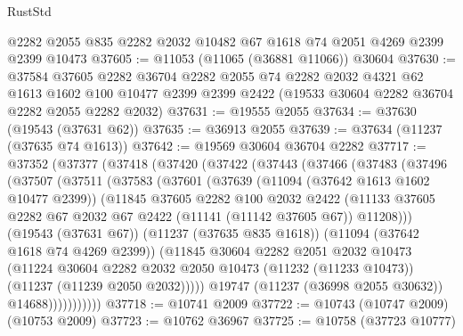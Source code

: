 \begin{lexlean}{RustStd}
\begin{coremodule}
    @2282
    @2055
    @835
    @2282
    @2032
    @10482
    @67
    @1618
    @74
    @2051
    @4269
    @2399
    @2399
    @10473
@37605 := @11053 (@11065 (@36881 @11066)) @30604
@37630 := @37584
    @37605
    @2282
    @36704
    @2282
    @2055
    @74
    @2282
    @2032
    @4321
    @62
    @1613
    @1602
    @100
    @10477
    @2399
    @2399
    @2422
    (@19533 @30604 @2282 @36704 @2282 @2055 @2282 @2032)
@37631 := @19555 @2055
@37634 := @37630 (@19543 (@37631 @62))
@37635 := @36913 @2055
@37639 := @37634 (@11237 (@37635 @74 @1613))
@37642 := @19569 @30604 @36704 @2282
@37717 := @37352
    (@37377
      (@37418
        (@37420
          (@37422
            (@37443
              (@37466
                (@37483
                  (@37496
                    (@37507
                      (@37511
                        (@37583
                          (@37601
                            (@37639
                              (@11094 (@37642 @1613 @1602 @10477 @2399))
                              (@11845
                                @37605
                                @2282
                                @100
                                @2032
                                @2422
                                (@11133
                                  @37605
                                  @2282
                                  @67
                                  @2032
                                  @67
                                  @2422
                                  (@11141 (@11142 @37605 @67))
                                  @11208)))
                            (@19543 (@37631 @67))
                            (@11237 (@37635 @835 @1618))
                            (@11094 (@37642 @1618 @74 @4269 @2399))
                            (@11845
                              @30604
                              @2282
                              @2051
                              @2032
                              @10473
                              (@11224
                                @30604
                                @2282
                                @2032
                                @2050
                                @10473
                                (@11232 (@11233 @10473))
                                (@11237 (@11239 @2050 @2032)))))
                          @19747
                          (@11237 (@36998 @2055 @30632))
                          @14688)))))))))))
@37718 := @10741 @2009
@37722 := @10743 (@10747 @2009) (@10753 @2009)
@37723 := @10762 @36967
@37725 := @10758 (@37723 @10777)

\end{coremodule}
\end{lexlean}
